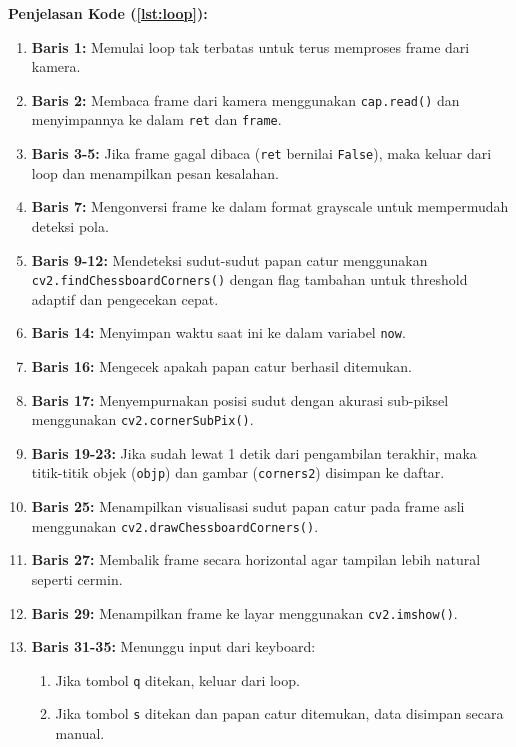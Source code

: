 \documentclass[12pt,a4paper]{article}
\begin{document}
\textbf{Penjelasan Kode (\ref{lst:loop}):}
\begin{enumerate}[label={}]
    \item \textbf{Baris 1:} Memulai loop tak terbatas untuk terus memproses frame dari kamera.
    \item \textbf{Baris 2:} Membaca frame dari kamera menggunakan \texttt{cap.read()} dan menyimpannya ke dalam \texttt{ret} dan \texttt{frame}.
    \item \textbf{Baris 3-5:} Jika frame gagal dibaca (\texttt{ret} bernilai \texttt{False}), maka keluar dari loop dan menampilkan pesan kesalahan.
    \item \textbf{Baris 7:} Mengonversi frame ke dalam format grayscale untuk mempermudah deteksi pola.
    \item \textbf{Baris 9-12:} Mendeteksi sudut-sudut papan catur menggunakan \texttt{cv2.findChessboardCorners()} dengan flag tambahan untuk threshold adaptif dan pengecekan cepat.
    \item \textbf{Baris 14:} Menyimpan waktu saat ini ke dalam variabel \texttt{now}.
    \item \textbf{Baris 16:} Mengecek apakah papan catur berhasil ditemukan.
    \item \textbf{Baris 17:} Menyempurnakan posisi sudut dengan akurasi sub-piksel menggunakan \texttt{cv2.cornerSubPix()}.
    \item \textbf{Baris 19-23:} Jika sudah lewat 1 detik dari pengambilan terakhir, maka titik-titik objek (\texttt{objp}) dan gambar (\texttt{corners2}) disimpan ke daftar.
    \item \textbf{Baris 25:} Menampilkan visualisasi sudut papan catur pada frame asli menggunakan \texttt{cv2.drawChessboardCorners()}.
    \item \textbf{Baris 27:} Membalik frame secara horizontal agar tampilan lebih natural seperti cermin.
    \item \textbf{Baris 29:} Menampilkan frame ke layar menggunakan \texttt{cv2.imshow()}.
    \item \textbf{Baris 31-35:} Menunggu input dari keyboard:
    \begin{enumerate}[label=\alph*.]
        \item Jika tombol \texttt{q} ditekan, keluar dari loop.
        \item Jika tombol \texttt{s} ditekan dan papan catur ditemukan, data disimpan secara manual.
    \end{enumerate}
\end{enumerate}
\end{document}
